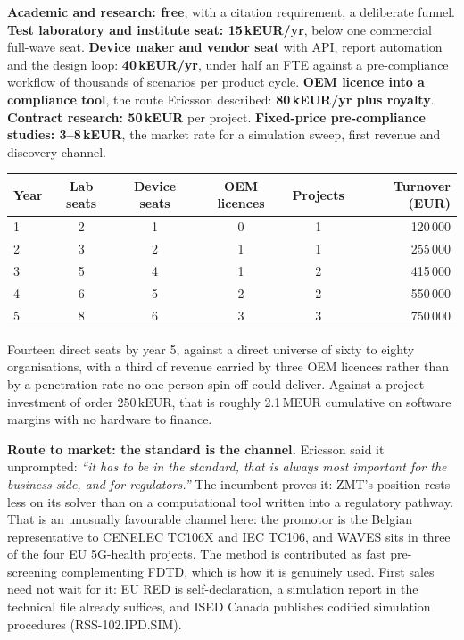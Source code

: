 \documentclass[10pt,a4paper]{article}
\begin{document}
\textbf{Academic and research: free}, with a citation requirement, a deliberate funnel. \textbf{Test laboratory and institute seat:
15\,kEUR/yr}, below one commercial full-wave seat. \textbf{Device maker and vendor seat} with API, report automation and the design
loop: \textbf{40\,kEUR/yr}, under half an FTE against a pre-compliance workflow of thousands of scenarios per product cycle.
\textbf{OEM licence into a compliance tool}, the route Ericsson described: \textbf{80\,kEUR/yr plus royalty}. \textbf{Contract research:
50\,kEUR} per project. \textbf{Fixed-price pre-compliance studies: 3--8\,kEUR}, the market rate for a simulation
sweep, first revenue and discovery channel.

\begin{center}\small
\begin{tabular}{@{}lccccr@{}}
\toprule
Year & Lab seats & Device seats & OEM licences & Projects & Turnover (EUR) \\
\midrule
1 & 2 & 1 & 0 & 1 & 120\,000 \\
2 & 3 & 2 & 1 & 1 & 255\,000 \\
3 & 5 & 4 & 1 & 2 & 415\,000 \\
4 & 6 & 5 & 2 & 2 & 550\,000 \\
5 & 8 & 6 & 3 & 3 & 750\,000 \\
\bottomrule
\end{tabular}
\end{center}

\noindent Fourteen direct seats by year 5, against a direct universe of sixty to eighty organisations, with a third of revenue
carried by three OEM licences rather than by a penetration rate no one-person spin-off could deliver. Against a project
investment of order 250\,kEUR, that is roughly 2.1\,MEUR cumulative on software margins with no hardware to finance.

\textbf{Route to market: the standard is the channel.} Ericsson said it unprompted: \textit{``it has
to be in the standard, that is always most important for the business side, and for regulators.''} The incumbent proves it: ZMT's position
rests less on its solver than on a computational tool written into a regulatory pathway. That is an
unusually favourable channel here: the promotor is the Belgian representative to CENELEC TC106X and IEC TC106, and WAVES sits in
three of the four EU 5G-health projects. The method is contributed as fast pre-screening complementing FDTD, which is how it is genuinely
used. First sales need not wait for it: EU RED is self-declaration, a simulation report in the technical
file already suffices, and ISED Canada publishes codified simulation procedures (RSS-102.IPD.SIM).
\end{document}
